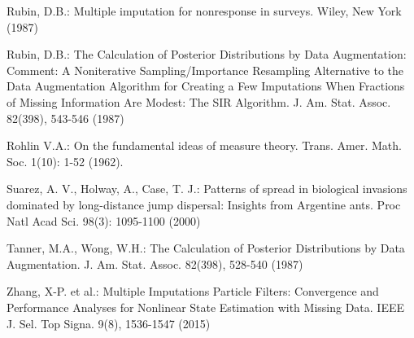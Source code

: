 \documentclass[9pt, xcolor={dvipsnames,svgnames,table}]{beamer}
\begin{document}
\begin{frame}[shrink=15]
\begin{thebibliography}{}
{
Rubin, D.B.: Multiple imputation for nonresponse in surveys. Wiley, New York (1987)

Rubin, D.B.: The Calculation of Posterior Distributions by Data Augmentation: Comment: A Noniterative Sampling/Importance Resampling Alternative to the Data Augmentation Algorithm for Creating a Few Imputations When Fractions of Missing Information Are Modest: The SIR Algorithm. J. Am. Stat. Assoc. 82(398), 543-546 (1987)

Rohlin V.A.: On the fundamental ideas of measure theory.  Trans.
Amer. Math. Soc. 1(10): 1-52 (1962).

 Suarez, A. V., Holway, A., Case, T. J.: Patterns of spread in biological invasions dominated by long-distance jump dispersal: Insights from Argentine ants. Proc Natl Acad Sci. 98(3): 1095-1100  (2000)

Tanner, M.A., Wong, W.H.: The Calculation of Posterior Distributions by Data Augmentation. J. Am. Stat. Assoc. 82(398), 528-540 (1987)

Zhang, X-P. et al.: Multiple Imputations Particle Filters: Convergence and Performance Analyses for Nonlinear State Estimation with Missing Data. IEEE J. Sel. Top Signa. 9(8), 1536-1547 (2015)}

\end{thebibliography}
\end{frame}
\end{document}
